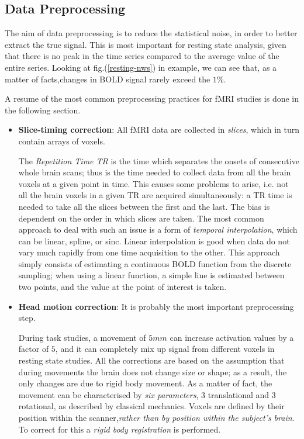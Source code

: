 \documentclass[12pt,openright,twoside,a4paper]{book}
\begin{document}
\subsection{Data Preprocessing}

The aim of data preprocessing is to reduce the statistical noise, in order to better extract the true signal.
This is most important for resting state analysis, given that there is no peak in the time series compared to the average value of the entire series. 
Looking at fig.(\ref{resting-nws}) in example, we can see that, as a matter of facts,changes in BOLD signal rarely exceed the $1\%$.

A resume of the most common preprocessing practices for fMRI studies is done in the following section.

\begin{itemize}
\item \textbf{Slice-timing correction}: All fMRI data are collected in \textit{slices}, which in turn contain arrays of voxels. 

The \textit{Repetition Time TR} is the time which separates the onsets of consecutive whole brain scans; thus is the time needed to collect data from all the brain voxels at a given point in time. 
This causes some problems to arise, i.e. not all the brain voxels in a given TR are acquired simultaneously: a TR time is needed to take all the slices between the first and the last. 
The bias is dependent on the order in which slices are taken. 
The most common approach to deal with such an issue is a form of \textit{temporal interpolation}, which can be linear, spline, or sinc. 
Linear interpolation is good when data do not vary much rapidly from one time acquisition to the other. This approach simply consists of estimating a continuous BOLD function from the discrete sampling; when using a linear function, a simple line is estimated between
two points, and the value at the point of interest is taken.

\item \textbf{Head motion correction}: It is probably the most important preprocessing step.

During task studies,  a movement of $5mm$ can increase activation values by a factor of $5$, and it can completely mix up signal from different voxels in resting state studies.
All the corrections are based on the assumption that during movements the brain does not change size or shape; as a result, the only changes are due to rigid body movement. 
 As a matter of fact, the movement can be characterised by \textit{six parameters}, 3 translational and 3 rotational, as described by classical mechanics. 
 Voxels are defined by their position within the scanner,\textit{rather than by position within the subject’s brain}. 
To correct for this a \textit{rigid body registration} is performed.


\end{itemize}
\end{document}
